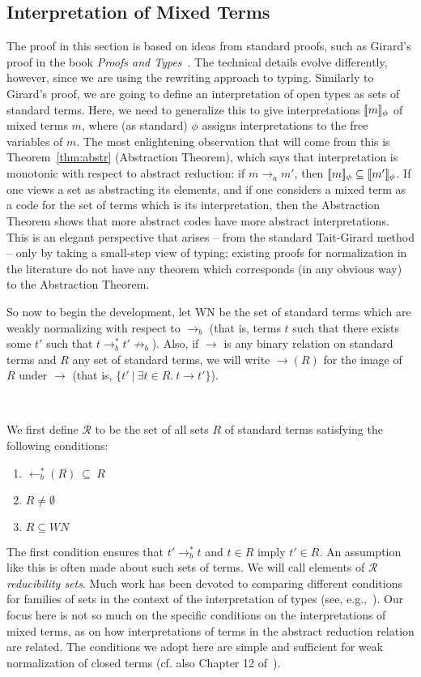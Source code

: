 \documentclass{LMCS}
\newcommand{\interp}[1]{[\negthinspace[#1]\negthinspace]}
\newcommand{\ot}[0]{\leftarrow}
\begin{document}
\subsection{Interpretation of Mixed Terms}
\label{sec:interp}

The proof in this section is based on ideas from standard proofs, such
as Girard's proof in the book \emph{Proofs and
  Types}~\cite{girard-proofs-types}.  The technical details evolve
differently, however, since we are using the rewriting approach to
typing.  Similarly to Girard's proof, we are going to define an
interpretation of open types as sets of standard terms.  Here, we need
to generalize this to give interpretations $\interp{m}_\phi$ of mixed
terms $m$, where (as standard) $\phi$ assigns interpretations to the
free variables of $m$.  The most enlightening observation that will
come from this is Theorem~\ref{thm:abstr} (Abstraction Theorem), which
says that interpretation is monotonic with respect to abstract
reduction: if $m\to_a m'$, then
$\interp{m}_\phi\subseteq\interp{m'}_\phi$.  If one views a set as
abstracting its elements, and if one considers a mixed term as a code
for the set of terms which is its interpretation, then the Abstraction
Theorem shows that more abstract codes have more abstract
interpretations.  This is an elegant perspective that arises -- from
the standard Tait-Girard method -- only by taking a small-step view of
typing; existing proofs for normalization in the literature do not
have any theorem which corresponds (in any obvious way) to the
Abstraction Theorem.

So now to begin the development, let WN be the set of standard terms
which are weakly normalizing with respect to $\to_b$ (that is, terms
$t$ such that there exists some $t'$ such that $t \to_b^* t'
\not\to_b$).  Also, if $\to$ is any binary relation on standard terms
and $R$ any set of standard terms, we will write $\to(R)$ for the
image of $R$ under $\to$ (that is, $\{ t'\ |\ \exists t\in R.\ t\to
t'\}$). 

\

\noindent We first define $\mathcal{R}$ to be the set of all sets $R$
of standard terms satisfying the following conditions:
\begin{enumerate}[(1)]
\item $\ot_b^*(R)\ \subseteq\ R$
\item $R \neq \emptyset$
\item $R\subseteq WN$
\end{enumerate}
\noindent The first condition ensures that $t'\to_b^* t$ and $t\in R$
imply $t'\in R$.  An assumption like this is often made about such
sets of terms.  We will call elements of $\mathcal{R}$
\emph{reducibility sets}.  Much work has been devoted to comparing
different conditions for families of sets in the context of the
interpretation of types (see, e.g.,~\cite{riba07,gallier90}).  Our
focus here is not so much on the specific conditions on the
interpretations of mixed terms, as on how interpretations of terms in
the abstract reduction relation are related.  The conditions we adopt
here are simple and sufficient for weak normalization of closed terms
(cf. also Chapter 12 of~\cite{pierce02}).
\end{document}
